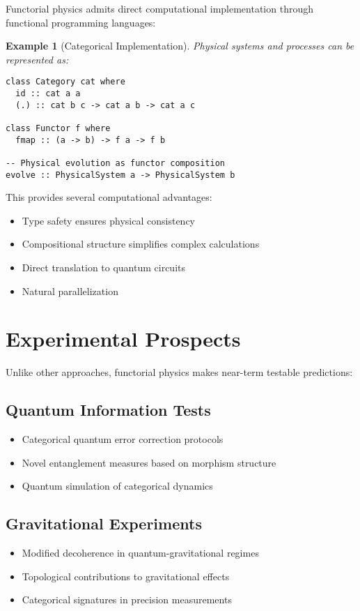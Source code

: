 \documentclass[11pt,a4paper]{article}
\newtheorem{example}[theorem]{Example}
\begin{document}
Functorial physics admits direct computational implementation through functional programming languages:

\begin{example}[Categorical Implementation]
Physical systems and processes can be represented as:
\begin{verbatim}
class Category cat where
  id :: cat a a
  (.) :: cat b c -> cat a b -> cat a c

class Functor f where
  fmap :: (a -> b) -> f a -> f b
  
-- Physical evolution as functor composition
evolve :: PhysicalSystem a -> PhysicalSystem b
\end{verbatim}
\end{example}

This provides several computational advantages:
\begin{itemize}
    \item Type safety ensures physical consistency
    \item Compositional structure simplifies complex calculations
    \item Direct translation to quantum circuits
    \item Natural parallelization
\end{itemize}

\section{Experimental Prospects}

Unlike other approaches, functorial physics makes near-term testable predictions:

\subsection{Quantum Information Tests}
\begin{itemize}
    \item Categorical quantum error correction protocols
    \item Novel entanglement measures based on morphism structure
    \item Quantum simulation of categorical dynamics
\end{itemize}

\subsection{Gravitational Experiments}
\begin{itemize}
    \item Modified decoherence in quantum-gravitational regimes
    \item Topological contributions to gravitational effects
    \item Categorical signatures in precision measurements
\end{itemize}
\end{document}

